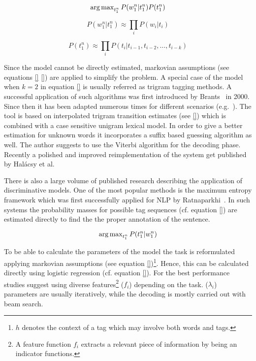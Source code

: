 \begin{equation}
\operatorname{arg\,max}_{t_1^n}  P(w_1^n|t_1^n) P(t_1^n)
\end{equation}

\begin{equation}
P(w_1^n|t_1^n) \approx \prod_i P(w_i|t_i)
\end{equation}

\begin{equation}
P(t_1^n) \approx \prod_i P(t_i|t_{i-1}, t_{i-2}, \dots, t_{i-k})
\end{equation}

Since the model cannot be directly estimated, markovian assumptions (see equations \eqref{} \eqref{}) are applied to simplify the problem.
A special case of the model when $k=2$ in equation \eqref{}  is usually referred as trigram tagging methods.
A successful application of such algorithms was first introduced by Brants~\cite{} in 2000.
Since then it has been adapted numerous times for different scenarios (e.g.~\cite{IceNLP,Finntagger,Hunpos,Oravecz}).
The tool is based on interpolated trigram transition estimates (see \eqref{}) which is combined with a case sensitive unigram lexical model.
In order to give a better estimation for unknown words it incorporates a suffix based guessing algorithm as well.
The author suggests to use the Viterbi algorithm for the decoding phase.
Recently a polished and improved reimplementation of the system get published by Halácsy et al.

There is also a large volume of published research describing the application of discriminative models.
One of the most popular methods is the maximum entropy framework which was first successfully applied for NLP by Ratnaparkhi~\cite{}.
In such systems the probability masses for possible tag sequences (cf. equation \eqref{}) are estimated directly to find the the proper annotation of the sentence.

\begin{equation} \operatorname{arg\,max}_{t_1^n} P(t_1^n | w_1^n) \end{equation}

To be able to calculate the parameters of the model the task is reformulated applying markovian assumptions (see equation \eqref{})\footnote{ $h$ denotes the context of a tag which may involve both words and tags. }.
Hence, this can be calculated directly using logistic regression (cf.  equation \eqref{}).
For the best performance studies suggest using diverse features\footnote{ A feature function $f_i$ extracts a relevant piece of information by being an indicator functions.} ($f_i$) depending on the task. ($\lambda_i$) parameters are usually iteratively, while the decoding is mostly carried out with beam search.

